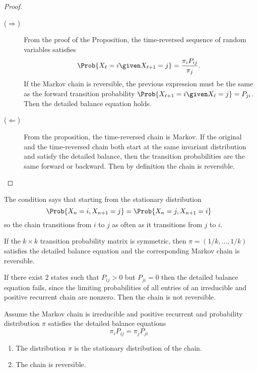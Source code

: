 \documentclass[12pt]{article}
\begin{document}
\begin{proof}
    \begin{description}
        \item[(\(\Rightarrow\))]
            From the proof of the Proposition, the time-reversed
            sequence of random variables satisfies
            \[
                \Prob{X_\ell = i \given X_{\ell+1} = j} = \frac{\pi_i P_
                {ij}}{\pi_j}.
            \] If the Markov chain is reversible, the previous
            expression must be the same as the forward transition
            probability \( \Prob{X_{\ell+1} = i \given X_{\ell} = j} = P_
            {ji} \).  Then the detailed balance equation holds.
        \item[(\(\Leftarrow\))]
            From the proposition, the time-reversed chain is Markov.  If
            the original and the time-reversed chain both start at the
            same invariant distribution and satisfy the detailed
            balance, then the transition probabilities are the same
            forward or backward.  Then by definition the chain is
            reversible.
    \end{description}
\end{proof}

\begin{remark}
    The condition says that starting from the stationary distribution
    \[
        \Prob{X_n =i, X_{n+1} = j} = \Prob{X_n =j, X_{n+1} = i}
    \] so the chain transitions from \( i \) to \( j \) as often as it
    transitions from \( j \) to \( i \).
\end{remark}

\begin{example}
    If the \( k \times k \) transition probability matrix is symmetric,
    then \( \pi = (1/k, \dots, 1/k) \) satisfies the detailed balance
    equation and the corresponding Markov chain is reversible.
\end{example}

\begin{remark}
    If there exist \( 2 \) states such that \( P_{ij} > 0 \) but \( P_{ji}
    = 0 \) then the detailed balance equation fails, since the limiting
    probabilities of all entries of an irreducible and positive
    recurrent chain are nonzero.  Then the chain is not reversible.
\end{remark}

\begin{theorem}
    \label{thm:reversiblemarkovchain:detbaleqn} Assume the Markov chain is
    irreducible and positive recurrent and probability distribution \(
    \pi \) satisfies the detailed balance equations
    \[
        \pi_i P_{ij} = \pi_j P_{ji}
    \]
    \begin{enumerate}
        \item
            The distribution \( \pi \) is the stationary distribution of
            the chain.
        \item
            The chain is reversible.
    \end{enumerate}
\end{theorem}
\end{document}
